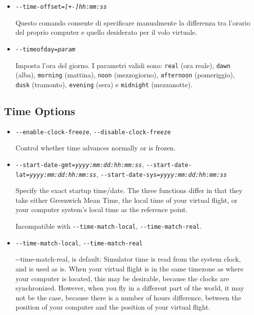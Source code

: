 {\begin{itemize}
  \item{\texttt{-$ $-time-offset={\it [+-]hh:mm:ss}}}

  Questo comando consente di specificare manualmente la differenza tra
  l'orario del proprio computer e quello desiderato per il volo virtuale.

  \item{\texttt{-$ $-timeofday={\it param}}}

  Imposta l'ora del giorno. I parametri validi sono: \texttt{real} (ora reale),
  \texttt{dawn} (alba), \texttt{morning} (mattina),
  \texttt{noon} (mezzogiorno), \texttt{afternoon} (pomeriggio),
  \texttt{dusk} (tramonto), \texttt{evening} (sera) e \texttt{midnight} (mezzanotte).

  \end{itemize}
}
{
  \subsection{Time Options}
  \begin{itemize}

  \item{\texttt{-$ $-enable-clock-freeze}, \texttt{-$ $-disable-clock-freeze}}

  Control whether time advances normally or is frozen.

  \item{\texttt{-$ $-start-date-gmt={\it yyyy:mm:dd:hh:mm:ss}},
  \texttt{-$ $-start-date-lat={\it yyyy:mm:dd:hh:mm:ss}},
  \texttt{-$ $-start-date-sys={\it yyyy:mm:dd:hh:mm:ss}}}

  Specify the exact startup time/date. The three functions differ in that they
  take either Greenwich Mean Time, the local time of your virtual flight, or
  your computer system's local time as the reference point.

  Incompatible with \texttt{-$ $-time-match-local}, \texttt{-$ $-time-match-real}.

  \item{\texttt{-$ $-time-match-local}, \texttt{-$ $-time-match-real}}

  {-$ $-time-match-real}, is default: Simulator time is read from the system clock, and
  is used as is. When your virtual flight is in the same timezone as where your computer
  is located, this may be desirable, because the clocks are synchronized. However,
  when you fly in a different part of the world, it may not be the case, because there
  is a number of hours difference, between the position of your computer and the position of your
  virtual flight.


\end{itemize}}
